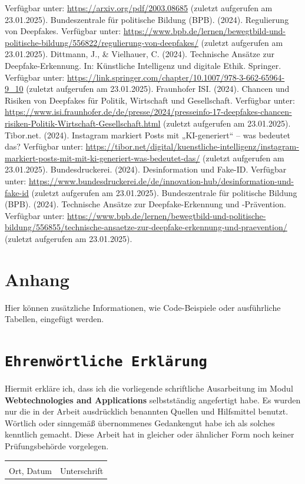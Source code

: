 \documentclass[a4paper,12pt]{article}
\begin{document}
\begin{thebibliography}{99}
    Verfügbar unter: \url{https://arxiv.org/pdf/2003.08685} (zuletzt aufgerufen am 23.01.2025). 
     Bundeszentrale für politische Bildung (BPB). (2024). Regulierung von Deepfakes. 
    Verfügbar unter: \url{https://www.bpb.de/lernen/bewegtbild-und-politische-bildung/556822/regulierung-von-deepfakes/} (zuletzt aufgerufen am 23.01.2025). 
     Dittmann, J., \& Vielhauer, C. (2024). Technische Ansätze zur Deepfake-Erkennung. In: Künstliche Intelligenz und digitale Ethik. Springer. 
    Verfügbar unter: \url{https://link.springer.com/chapter/10.1007/978-3-662-65964-9_10} (zuletzt aufgerufen am 23.01.2025).
     Fraunhofer ISI. (2024). Chancen und Risiken von Deepfakes für Politik, Wirtschaft und Gesellschaft. 
    Verfügbar unter: \url{https://www.isi.fraunhofer.de/de/presse/2024/presseinfo-17-deepfakes-chancen-risiken-Politik-Wirtschaft-Gesellschaft.html} (zuletzt aufgerufen am 23.01.2025). 
     Tibor.net. (2024). Instagram markiert Posts mit „KI-generiert“ – was bedeutet das? 
    Verfügbar unter: \url{https://tibor.net/digital/kuenstliche-intelligenz/instagram-markiert-posts-mit-mit-ki-generiert-was-bedeutet-das/} (zuletzt aufgerufen am 23.01.2025).
     Bundesdruckerei. (2024). Desinformation und Fake-ID. 
    Verfügbar unter: \url{https://www.bundesdruckerei.de/de/innovation-hub/desinformation-und-fake-id} (zuletzt aufgerufen am 23.01.2025). 
     Bundeszentrale für politische Bildung (BPB). (2024). Technische Ansätze zur Deepfake-Erkennung und -Prävention. 
    Verfügbar unter: \url{https://www.bpb.de/lernen/bewegtbild-und-politische-bildung/556855/technische-ansaetze-zur-deepfake-erkennung-und-praevention/} (zuletzt aufgerufen am 23.01.2025).
\end{thebibliography}


\newpage
\appendix
\section{Anhang}
Hier können zusätzliche Informationen, wie Code-Beispiele oder ausführliche Tabellen, eingefügt werden.

\newpage
{}
\section*{\texttt{Ehrenwörtliche Erklärung}}
Hiermit erkläre ich, dass ich die vorliegende schriftliche Ausarbeitung im Modul \textbf{Webtechnologies and Applications} selbstständig
angefertigt habe. Es wurden nur die in der Arbeit ausdrücklich benannten Quellen und
Hilfsmittel benutzt. Wörtlich oder sinngemäß übernommenes Gedankengut habe ich als
solches kenntlich gemacht. Diese Arbeit hat in gleicher oder ähnlicher Form noch keiner
Prüfungsbehörde vorgelegen.

\vspace{3cm}
\noindent\begin{tabular}{p{}p{}}
    \hrulefill & \hrulefill \\
    Ort, Datum & Unterschrift \\
\end{tabular}
\end{document}
